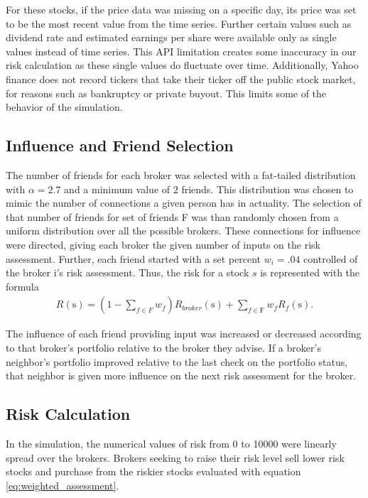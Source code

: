 \documentclass[letterpaper, 11 pt, proceedings]{IEEEtran}
\begin{document}
	For these stocks, if the price data was missing on a specific day, its price was set to be the most recent value from the time series. Further certain values such as dividend rate and estimated earnings per share were available only as single values instead of time series. This API limitation creates some inaccuracy in our risk calculation as these single values do fluctuate over time. Additionally, Yahoo finance does not record tickers that take their ticker off the public stock market, for reasons such as bankruptcy or private buyout. This limits some of the behavior of the simulation.  
	

	\subsection{Influence and Friend Selection}\label{subsec:friends}
	The number of friends for each broker was selected with a fat-tailed distribution with $\alpha = 2.7$ and a minimum value of $2$ friends. This distribution was chosen to mimic the number of connections a given person has in actuality. The selection of that number of friends for set of friends F was than randomly chosen from a uniform distribution over all the possible brokers. These connections for influence were directed, giving each broker the given number of inputs on the risk assessment. Further, each friend started with a set percent $w_i = .04$ controlled of the broker i's risk assessment. Thus, the risk for a stock $s$ is represented with the formula 
	\begin{align}
		R(\text{s}) = (1-\sum\limits_{f\in F} w_f) R_{broker}(\text{s}) + \sum\limits_{f\in \text{F}} w_f R_f(\text{s}).\label{eq:weighted_assessment}
	\end{align}	
	
	The influence of each friend providing input was increased or decreased according to that broker's portfolio relative to the broker they advise. If a broker's neighbor's portfolio improved relative to the last check on the portfolio status, that neighbor is given more influence on the next risk assessment for the broker.

	\subsection{Risk Calculation}\label{subsec:risk}
	
	
	In the simulation, the numerical values of risk from 0 to 10000 were linearly spread over the brokers. Brokers seeking to raise their risk level sell lower risk stocks and purchase from the riskier stocks evaluated with equation \ref{eq:weighted_assessment}.
\end{document}
